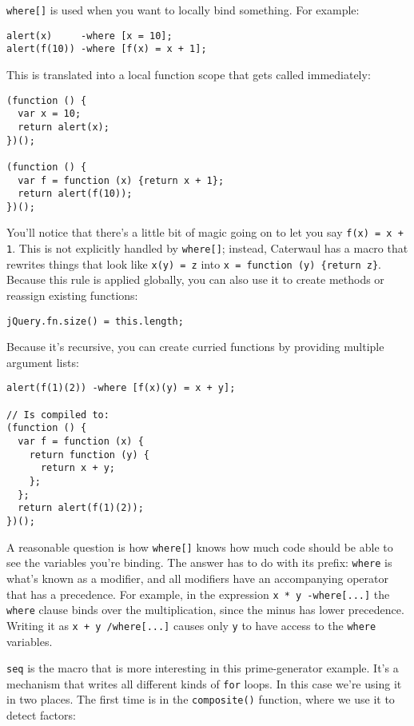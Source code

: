 \documentclass{report}
\begin{document}
    {\tt where[]} is used when you want to locally bind something. For example:

\begin{verbatim}
alert(x)     -where [x = 10];
alert(f(10)) -where [f(x) = x + 1];
\end{verbatim}

    This is translated into a local function scope that gets called immediately:

\begin{verbatim}
(function () {
  var x = 10;
  return alert(x);
})();

(function () {
  var f = function (x) {return x + 1};
  return alert(f(10));
})();
\end{verbatim}

    You'll notice that there's a little bit of magic going on to let you say {\tt f(x) = x + 1}. This is not explicitly handled by {\tt where[]}; instead, Caterwaul has a macro that rewrites
    things that look like {\tt x(y) = z} into \verb|x = function (y) {return z}|. Because this rule is applied globally, you can also use it to create methods or reassign existing functions:

\begin{verbatim}
jQuery.fn.size() = this.length;
\end{verbatim}

    Because it's recursive, you can create curried functions by providing multiple argument lists:

\begin{verbatim}
alert(f(1)(2)) -where [f(x)(y) = x + y];

// Is compiled to:
(function () {
  var f = function (x) {
    return function (y) {
      return x + y;
    };
  };
  return alert(f(1)(2));
})();
\end{verbatim}

    A reasonable question is how {\tt where[]} knows how much code should be able to see the variables you're binding. The answer has to do with its prefix: {\tt where} is what's known as a
    modifier, and all modifiers have an accompanying operator that has a precedence. For example, in the expression {\tt x * y -where[...]} the {\tt where} clause binds over the
    multiplication, since the minus has lower precedence. Writing it as {\tt x + y /where[...]} causes only {\tt y} to have access to the {\tt where} variables.

    {\tt seq} is the macro that is more interesting in this prime-generator example. It's a mechanism that writes all different kinds of {\tt for} loops. In this case we're using it in two
    places. The first time is in the {\tt composite()} function, where we use it to detect factors:
\end{document}
